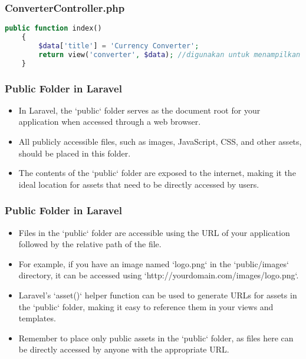 \documentclass[aspectratio=169, table]{beamer}
\begin{document}
\begin{frame}[fragile]
    \frametitle{ConverterController.php}
    \begin{lstlisting}[language=PHP]
public function index()
    {
        $data['title'] = 'Currency Converter';
        return view('converter', $data); //digunakan untuk menampilkan view yang ada di folder views
    }
    \end{lstlisting}
\end{frame}

\begin{frame}[fragile]
    \frametitle{Public Folder in Laravel}
    \begin{itemize}
        \item In Laravel, the `public` folder serves as the document root for your application when accessed through a web browser.
        \item All publicly accessible files, such as images, JavaScript, CSS, and other assets, should be placed in this folder.
        \item The contents of the `public` folder are exposed to the internet, making it the ideal location for assets that need to be directly accessed by users.
    \end{itemize}
\end{frame}

\begin{frame}[fragile]
    \frametitle{Public Folder in Laravel}
    \begin{itemize}
        \item Files in the `public` folder are accessible using the URL of your application followed by the relative path of the file.
        \item For example, if you have an image named `logo.png` in the `public/images` directory, it can be accessed using `http://yourdomain.com/images/logo.png`.
        \item Laravel's `asset()` helper function can be used to generate URLs for assets in the `public` folder, making it easy to reference them in your views and templates.
        \item Remember to place only public assets in the `public` folder, as files here can be directly accessed by anyone with the appropriate URL.
    \end{itemize}
\end{frame}
\end{document}
